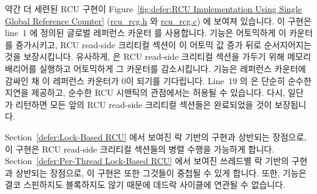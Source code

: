 약간 더 세련된 RCU 구현이
Figure~\ref{fig:defer:RCU Implementation Using Single Global Reference Counter}
(\url{rcu_rcg.h} 와 \url{rcu_rcg.c}) 에 보여져 있습니다.
이 구현은 line~1 에 정의된 글로벌 레퍼런스 카운터  를
사용합니다.
 기능은 어토믹하게 이 카운터를 증가시키고, RCU read-side
크리티컬 섹션이 이 어토믹 값 증가 뒤로 순서지어지는 것을 보장시킵니다.
유사하게,  은 RCU read-side 크리티컬 섹션을 가두기 위해
메모리 배리어를 실행하고 어토믹하게 그 카운터를 감소시킵니다.
 기능은 레퍼런스 카운터에 감싸인 채 이 레퍼런스 카운터가
0이 되기를 기다립니다.
Line~19 의  은 단순히 순수한 지연을 제공하고, 순수한 RCU 시맨틱의
관점에서는 허용될 수 있습니다.
다시, 일단  가 리턴하면 모든 앞의 RCU read-side 크리티컬
섹션들은 완료되었을 것이 보장됩니다.
\iffalse

A slightly more sophisticated RCU implementation is shown in
Figure~\ref{fig:defer:RCU Implementation Using Single Global Reference Counter}
(\url{rcu_rcg.h} and \url{rcu_rcg.c}).
This implementation makes use of a global reference counter
\co{rcu_refcnt} defined on line~1.
The \co{rcu_read_lock()} primitive atomically increments this
counter, then executes a memory barrier to ensure that the
RCU read-side critical section is ordered after the atomic
increment.
Similarly, \co{rcu_read_unlock()} executes a memory barrier to
confine the RCU read-side critical section, then atomically
decrements the counter.
The \co{synchronize_rcu()} primitive spins waiting for the reference
counter to reach zero, surrounded by memory barriers.
The \co{poll()} on line~19 merely provides pure delay, and from
a pure RCU-semantics point of view could be omitted.
Again, once \co{synchronize_rcu()} returns, all prior
RCU read-side critical sections are guaranteed to have completed.
\fi

Section~\ref{defer:Lock-Based RCU} 에서 보여진 락 기반의 구현과 상반되는
장점으로, 이 구현은 RCU read-side 크리티컬 섹션들의 병렬 수행을 가능하게
합니다.
Section~\ref{defer:Per-Thread Lock-Based RCU} 에서 보여진 쓰레드별 락 기반의
구현과 상반되는 장점으로, 이 구현은 또한 그것들이 중첩될 수 있게 합니다.
또한,  기능은 결코 스핀하지도 블록하지도 않기 때문에 데드락
사이클에 연관될 수 없습니다.
\iffalse

In happy contrast to the lock-based implementation shown in
Section~\ref{defer:Lock-Based RCU}, this implementation
allows parallel execution of RCU read-side critical sections.
In happy contrast to the per-thread lock-based implementation shown in
Section~\ref{defer:Per-Thread Lock-Based RCU},
it also allows them to be nested.
In addition, the \co{rcu_read_lock()} primitive cannot possibly
participate in deadlock cycles, as it never spins nor blocks.
\fi

